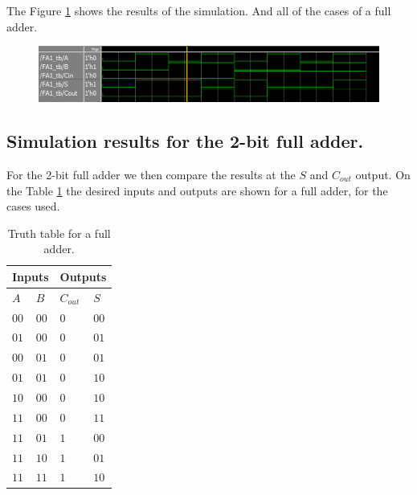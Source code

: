 \documentclass[conference]{IEEEtran}
\begin{document}
	The Figure \ref{fig:fa1bsim} shows the results of the simulation. And all of the cases of a full adder.
	
	\begin{figure}[H]
		\centering
		\includegraphics[width=\columnwidth]{FA_1B_sim}
		\caption{}
		\label{fig:fa1bsim}
	\end{figure}
	
	\subsection{Simulation results for the 2-bit full adder.}
	For the 2-bit full adder we then compare the results at the \(S\) and \(C_{out}\) output. On the Table \ref{tab:FA_2B_TT} the desired inputs and outputs are shown for a full adder, for the cases used.
	
	\begin{table}[H]
		\centering
		\begin{tabular}{|m{.2cm}|m{0.2cm}|m{0.5cm}|m{0.5cm}|}
			\hline
			\multicolumn{2}{|c|}{Inputs} & \multicolumn{2}{c|}{Outputs} \\
			\hline
			\(A\) & \(B\) & \(C_{out}\) & \(S\) \\
			\hline
			\centering\(00\) & \centering\(00\) & \centering\(0\) & \(00\) \\
			\centering\(01\) & \centering\(00\) & \centering\(0\) & \(01\) \\
			\centering\(00\) & \centering\(01\) & \centering\(0\) & \(01\) \\
			\centering\(01\) & \centering\(01\) & \centering\(0\) & \(10\) \\
			\centering\(10\) & \centering\(00\) & \centering\(0\) & \(10\) \\
			\centering\(11\) & \centering\(00\) & \centering\(0\) & \(11\) \\
			\centering\(11\) & \centering\(01\) & \centering\(1\) & \(00\) \\
			\centering\(11\) & \centering\(10\) & \centering\(1\) & \(01\) \\
			\centering\(11\) & \centering\(11\) & \centering\(1\) & \(10\) \\
			\hline
		\end{tabular}
		\caption{Truth table for a full adder.}
		\label{tab:FA_2B_TT}
	\end{table}
	
\end{document}
